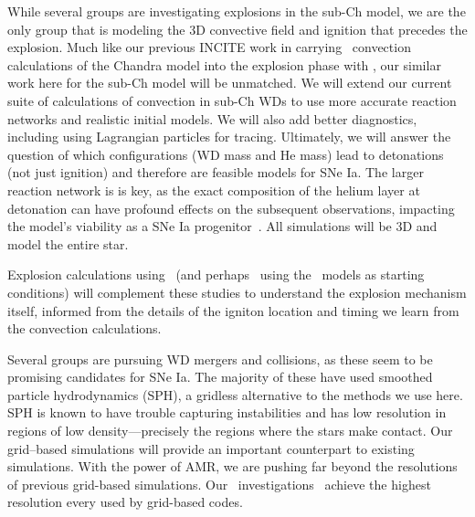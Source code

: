 \documentclass[11pt,letterpaper,english]{article}
\begin{document}
While several groups are investigating explosions in the sub-Ch model,
we are the only group that is modeling the 3D convective field and
ignition that precedes the explosion.  Much like our previous INCITE
work in carrying \maestro\ convection calculations of the Chandra
model into the explosion phase with \castro, our similar work here for
the sub-Ch model will be unmatched.  We will extend our current suite
of calculations of convection in sub-Ch WDs to use more accurate
reaction networks and realistic initial models.  We will also add
better diagnostics, including using Lagrangian particles for tracing.
Ultimately, we will answer the question of which configurations (WD
mass and He mass) lead to detonations (not just ignition) and
therefore are feasible models for SNe Ia.  The larger reaction network
is is key, as the exact composition of the helium layer at detonation
can have profound effects on the subsequent observations, impacting
the model's viability as a SNe Ia progenitor~\cite{kromer:2010}.  All
simulations will be 3D and model the entire star.

Explosion calculations using \flash\ (and perhaps \castro\ using the
\maestro\ models as starting conditions) will complement these studies
to understand the explosion mechanism itself, informed from the
details of the igniton location and timing we learn from the
convection calculations.
 
Several groups are pursuing WD mergers and collisions, as these seem  
to be promising candidates for SNe Ia.  The majority of these have
used smoothed particle hydrodynamics (SPH), a gridless alternative to
the methods we use here.  SPH is known to have trouble capturing
instabilities and has low resolution in regions of low
density---precisely the regions where the stars make contact.  Our
grid--based simulations will provide an important counterpart to
existing simulations.  With the power of AMR, we are pushing far
beyond the resolutions of previous grid-based simulations.  Our
\castro\ investigations~\cite{katz:2016}  achieve the highest
resolution every used by grid-based codes.  
\end{document}
